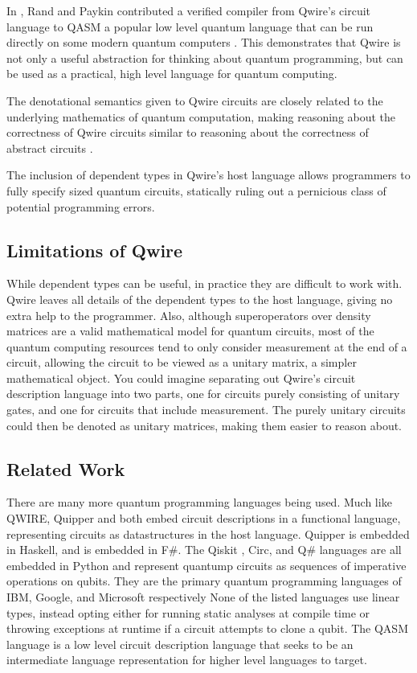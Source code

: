 In , Rand and Paykin contributed a verified compiler from Qwire's circuit language to QASM  a popular low level quantum language that can be run directly on some modern quantum computers .
This demonstrates that Qwire is not only a useful abstraction for thinking about quantum programming, but can be used as a practical, high level language for quantum computing.

The denotational semantics given to Qwire circuits are closely related to the underlying mathematics of quantum computation, making reasoning about the correctness of Qwire circuits similar to reasoning about the correctness of abstract circuits .

The inclusion of dependent types in Qwire's host language allows programmers to fully specify sized quantum circuits, statically ruling out a pernicious class of potential programming errors.

\subsection{Limitations of Qwire}

While dependent types can be useful, in practice they are difficult to work with.
Qwire leaves all details of the dependent types to the host language, giving no extra help to the programmer.
Also, although superoperators over density matrices are a valid mathematical model for quantum circuits, most of the quantum computing resources tend to only consider measurement at the end of a circuit, allowing the circuit to be viewed as a unitary matrix, a simpler mathematical object.
You could imagine separating out Qwire's circuit description language into two parts, one for circuits purely consisting of unitary gates, and one for circuits that include measurement.
The purely unitary circuits could then be denoted as unitary matrices, making them easier to reason about.

\subsection{Related Work}

There are many more quantum programming languages being used. 
Much like QWIRE, Quipper and \liquid {} both embed circuit descriptions in a functional language, representing circuits as datastructures in the host language.
Quipper is embedded in Haskell, and \liquid is embedded in F\#.
The Qiskit , Circ, and Q\# languages are all embedded in Python and represent quantump circuits as sequences of imperative operations on qubits.
They are the primary quantum programming languages of IBM, Google, and Microsoft respectively
None of the listed languages use linear types, instead opting either for running static analyses at compile time or throwing exceptions at runtime if a circuit attempts to clone a qubit.
The QASM language  is a low level circuit description language that seeks to be an intermediate language representation for higher level languages to target.

